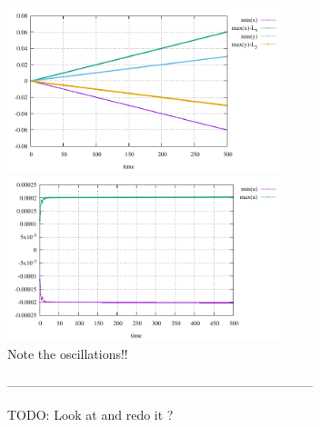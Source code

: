 \begin{center}
\includegraphics[width=8cm]{python_codes/fieldstone_129/results/experiment5/size}
\includegraphics[width=8cm]{python_codes/fieldstone_129/results/experiment5/velx}\\
{\captionfont Note the oscillations!!}
\end{center}




------------------------------------------------------------------------

TODO: Look at  and redo it ?








